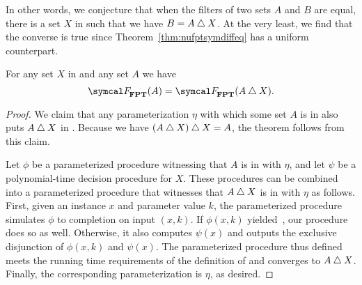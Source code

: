 In other words, we conjecture that when the filters of two sets $A$ and $B$ are equal, there is a set $X$ in  such that we have $B = A \bigtriangleup X$.
At the very least, we find that the converse is true since Theorem~\ref{thm:nufptsymdiffeq} has a uniform counterpart.
\begin{theorem}
  For any set $X$ in  and any set $A$ we have
  \begin{equation*}
    \calF_\cl{FPT}(A) = \calF_\cl{FPT}(A \symdiff X).
  \end{equation*}
\end{theorem}
\begin{proof}
  We claim that any parameterization $\eta$ with which some set $A$ is in  also puts $A \bigtriangleup X$ in .
  Because we have $(A \bigtriangleup X) \bigtriangleup X = A$, the theorem follows from this claim.

  Let $\phi$ be a parameterized procedure witnessing that $A$ is in  with $\eta$, and let $\psi$ be a polynomial-time decision procedure for $X$.
  These procedures can be combined into a parameterized procedure that witnesses that $A \bigtriangleup X$ is in  with $\eta$ as follows.
  First, given an instance $x$ and parameter value $k$, the parameterized procedure simulates $\phi$ to completion on input $(x, k)$.
  If $\phi(x, k)$ yielded~, our procedure does so as well.
  Otherwise, it also computes $\psi(x)$ and outputs the exclusive disjunction of $\phi(x, k)$ and $\psi(x)$.
  The parameterized procedure thus defined meets the running time requirements of the definition of  and converges to $A \bigtriangleup X$.
  Finally, the corresponding parameterization is $\eta$, as desired.
\end{proof}

